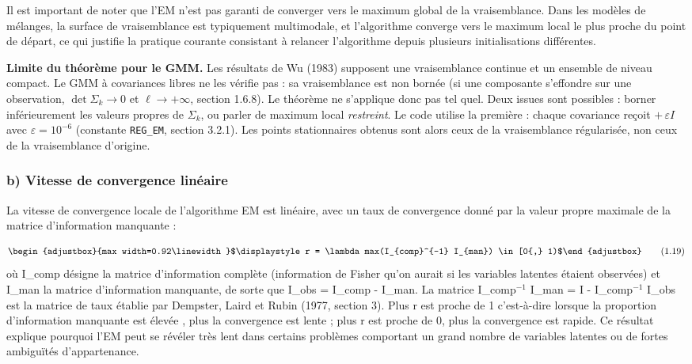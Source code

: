 Il est important de noter que l'EM n'est pas garanti de converger vers le maximum global de la vraisemblance. Dans les modèles de mélanges, la surface de vraisemblance est typiquement multimodale, et l'algorithme converge vers le maximum local le plus proche du point de départ, ce qui justifie la pratique courante consistant à relancer l'algorithme depuis plusieurs initialisations différentes.

\textbf{Limite du théorème pour le GMM. }Les résultats de Wu (1983) supposent une vraisemblance continue et un ensemble de niveau compact. Le GMM à covariances libres ne les vérifie pas : sa vraisemblance est non bornée (si une composante s'effondre sur une observation, $\det\Sigma_k \to 0$ et $\ell \to +\infty$, section 1.6.8). Le théorème ne s'applique donc pas tel quel. Deux issues sont possibles : borner inférieurement les valeurs propres de $\Sigma_k$, ou parler de maximum local \emph{restreint}. Le code utilise la première : chaque covariance reçoit $+\,\varepsilon I$ avec $\varepsilon = 10^{-6}$ (constante \texttt{REG\_EM}, section 3.2.1). Les points stationnaires obtenus sont alors ceux de la vraisemblance régularisée, non ceux de la vraisemblance d'origine.

\subsubsection{b) Vitesse de convergence linéaire}
La vitesse de convergence locale de l'algorithme EM est linéaire, avec un taux de convergence donné par la valeur propre maximale de la matrice d'information manquante :

\begin{equation}
\begin{adjustbox}{max width=0.92\linewidth}$\displaystyle r = \lambda max(I_{comp}^{-1} I_{man}) \in  [0{,} 1)$\end{adjustbox}
\tag{1.19}
\label{eq:1_19}
\end{equation}
où I\_comp désigne la matrice d'information complète (information de Fisher qu'on aurait si les variables latentes étaient observées) et I\_man la matrice d'information manquante, de sorte que I\_obs = I\_comp - I\_man. La matrice I\_comp$^{-1}$ I\_man = I - I\_comp$^{-1}$ I\_obs est la matrice de taux établie par Dempster, Laird et Rubin (1977, section 3). Plus r est proche de 1  c'est-à-dire lorsque la proportion d'information manquante est élevée , plus la convergence est lente ; plus r est proche de 0, plus la convergence est rapide. Ce résultat explique pourquoi l'EM peut se révéler très lent dans certains problèmes comportant un grand nombre de variables latentes ou de fortes ambiguïtés d'appartenance.

